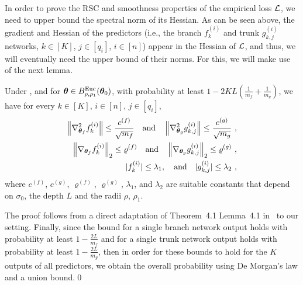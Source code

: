 In order to prove the RSC and smoothness properties of the empirical loss ${\cal L}$, we need to upper bound the spectral norm of its Hessian. As can be seen above, the gradient and Hessian of the predictors (i.e., the branch $f_k^{(i)}$ and trunk $g^{(i)}_{k,j}$ networks, $k\in[K]$, $j\in[q_i]$, $i\in[n]$) appear in the Hessian of ${\cal L}$, and thus, we will eventually need the upper bound of their norms. For this, we will make use of the next lemma.  
\begin{lemm}
\label{lemm:hessgradbounds}
Under , and for ${\bm{\theta}} \in B^{\mathrm{Euc}}_{\rho,\rho_1}({\bm{\theta}}_0)$, with probability at least {$1-2KL\left(\frac{1}{m_f}+\frac{1}{m_g}\right)$}, we have for every $k\in [K]$, $i\in[n]$, $j\in[q_i]$,
\begin{align}
    \begin{aligned}
        \left\|\nabla^2_{{\bm{\theta}}_f} f^{(i)}_k \right\| \leq \frac{c^{(f)}}{\sqrt{m_f}} \quad \text{and}\quad 
        \left\|\nabla^2_{{\bm{\theta}}_g} g^{(i)}_{k,j} \right\| \leq \frac{c^{(g)}}{\sqrt{m_g}}~,
        \\
    \left\| \nabla_{{\bm{\theta}}_f} f_k^{(i)}\right\|_2 \leq \varrho^{(f)} \quad \text{and}\quad \left\| \nabla_{{\bm{\theta}}_g} g^{(i)}_{k,j}\right\|_2 \leq \varrho^{(g)}~,\\
     |f_k^{(i)}| \leq \lambda_1, \quad \text{and}\quad |  g^{(i)}_{k,j}| \leq \lambda_2~,
    \end{aligned}\label{eq:gradientBoundG_fg}
\end{align}
where $c^{(f)}$, $c^{(g)}$, $\varrho^{(f)}$, $\varrho^{(g)}$, $\lambda_1$, and $\lambda_2$ are suitable constants that depend on $\sigma_0$, the depth $L$ and the radii $\rho$, $\rho_1$. 
%
%
\end{lemm}
\proof The proof follows from a direct adaptation of Theorem~4.1  Lemma~4.1 in~\citep{banerjee2022restricted} to our setting.  
Finally, since the bound for a single branch network output holds with probability at least $1-\frac{2L}{m_f}$ and for a single trunk network output holds with probability at least $1-\frac{2L}{m_g}$, then in order for these bounds to hold for the $K$ outputs of all predictors, we obtain the overall probability using De Morgan's law and a union bound.\qed

